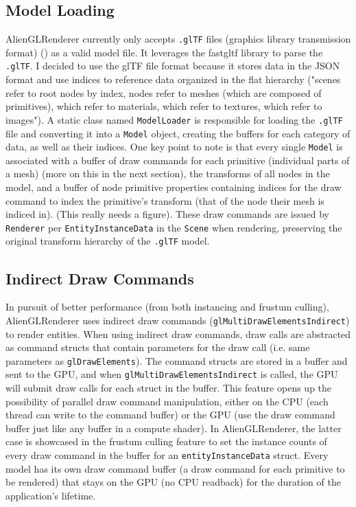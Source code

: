 \documentclass[letterpaper, 10 pt, conference]{ieeeconf}  %
\begin{document}
\subsection {Model Loading}
AlienGLRenderer currently only accepts \texttt{.glTF} files (graphics library transmission format) (\cite{GLTF}) as a valid model file. It leverages the fastgltf library to parse the \texttt{.glTF}. I decided to use the glTF file format because it stores data in the JSON format and use indices to reference data organized in the flat hierarchy ("scenes refer to root nodes by index, nodes refer to meshes (which are composed of primitives), which refer to materials, which refer to textures, which refer to images"). A static class named \texttt{ModelLoader} is responsible for loading the \texttt{.glTF} file and converting it into a \texttt{Model} object, creating the buffers for each category of data, as well as their indices. One key point to note is that every single \texttt{Model} is associated with a buffer of draw commands for each primitive (individual parts of a mesh) (more on this in the next section), the transforms of all nodes in the model, and a buffer of node primitive properties containing indices for the draw command to index the primitive's transform (that of the node their mesh is indiced in). (This really needs a figure). These draw commands are issued by \texttt{Renderer} per \texttt{EntityInstanceData} in the \texttt{Scene} when rendering, preserving the original transform hierarchy of the \texttt{.glTF} model.

\subsection {Indirect Draw Commands}
In pursuit of better performance (from both instancing and frustum culling), AlienGLRenderer uses indirect draw commands (\texttt{glMultiDrawElementsIndirect}) to render entities. When using indirect draw commands, draw calls are abstracted as command structs that contain parameters for the draw call (i.e. same parameters as \texttt{glDrawElements}). The command structs are stored in a buffer and sent to the GPU, and when \texttt{glMultiDrawElementsIndirect} is called, the GPU will submit draw calls for each struct in the buffer. This feature opens up the possibility of parallel draw command manipulation, either on the CPU (each thread can write to the command buffer) or the GPU (use the draw command buffer just like any buffer in a compute shader). In AlienGLRenderer, the latter case is showcased in the frustum culling feature to set the instance counts of every draw command in the buffer for an \texttt{entityInstanceData} struct. Every model has its own draw command buffer (a draw command for each primitive to be rendered) that stays on the GPU (no CPU readback) for the duration of the application's lifetime.
\end{document}
